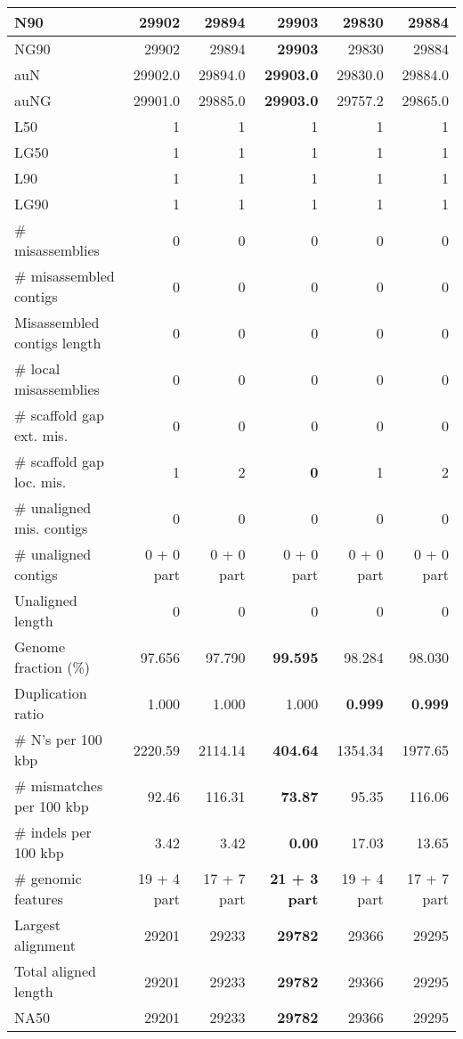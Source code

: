 \documentclass[12pt,a4paper]{article}
\begin{document}
\begin{table}[ht]
\begin{center}
\begin{tabular}{|l*{5}{|r}|}
N90 & 29902 & 29894 & {\bf 29903} & 29830 & 29884 \\ \hline
NG90 & 29902 & 29894 & {\bf 29903} & 29830 & 29884 \\ \hline
auN & 29902.0 & 29894.0 & {\bf 29903.0} & 29830.0 & 29884.0 \\ \hline
auNG & 29901.0 & 29885.0 & {\bf 29903.0} & 29757.2 & 29865.0 \\ \hline
L50 & 1 & 1 & 1 & 1 & 1 \\ \hline
LG50 & 1 & 1 & 1 & 1 & 1 \\ \hline
L90 & 1 & 1 & 1 & 1 & 1 \\ \hline
LG90 & 1 & 1 & 1 & 1 & 1 \\ \hline
\# misassemblies & 0 & 0 & 0 & 0 & 0 \\ \hline
\# misassembled contigs & 0 & 0 & 0 & 0 & 0 \\ \hline
Misassembled contigs length & 0 & 0 & 0 & 0 & 0 \\ \hline
\# local misassemblies & 0 & 0 & 0 & 0 & 0 \\ \hline
\# scaffold gap ext. mis. & 0 & 0 & 0 & 0 & 0 \\ \hline
\# scaffold gap loc. mis. & 1 & 2 & {\bf 0} & 1 & 2 \\ \hline
\# unaligned mis. contigs & 0 & 0 & 0 & 0 & 0 \\ \hline
\# unaligned contigs & 0 + 0 part & 0 + 0 part & 0 + 0 part & 0 + 0 part & 0 + 0 part \\ \hline
Unaligned length & 0 & 0 & 0 & 0 & 0 \\ \hline
Genome fraction (\%) & 97.656 & 97.790 & {\bf 99.595} & 98.284 & 98.030 \\ \hline
Duplication ratio & 1.000 & 1.000 & 1.000 & {\bf 0.999} & {\bf 0.999} \\ \hline
\# N's per 100 kbp & 2220.59 & 2114.14 & {\bf 404.64} & 1354.34 & 1977.65 \\ \hline
\# mismatches per 100 kbp & 92.46 & 116.31 & {\bf 73.87} & 95.35 & 116.06 \\ \hline
\# indels per 100 kbp & 3.42 & 3.42 & {\bf 0.00} & 17.03 & 13.65 \\ \hline
\# genomic features & 19 + 4 part & 17 + 7 part & {\bf 21 + 3 part} & 19 + 4 part & 17 + 7 part \\ \hline
Largest alignment & 29201 & 29233 & {\bf 29782} & 29366 & 29295 \\ \hline
Total aligned length & 29201 & 29233 & {\bf 29782} & 29366 & 29295 \\ \hline
NA50 & 29201 & 29233 & {\bf 29782} & 29366 & 29295 \\ \hline

\end{tabular}
\end{center}
\end{table}
\end{document}
